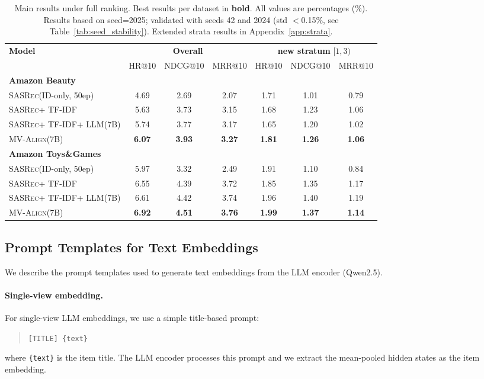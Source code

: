 \documentclass[sigconf,natbib=true]{acmart}
\newcommand{\model}{\textsc{MV-Align}\xspace}
\newcommand{\base}{\textsc{SASRec}\xspace}
\newcommand{\tfidf}{\textsc{TF-IDF}\xspace}
\newcommand{\llm}{\textsc{LLM}\xspace}
\begin{document}
\begin{table}[t]
\caption{Main results under full ranking. Best results per dataset in \textbf{bold}. All values are percentages (\%). Results based on seed=2025; validated with seeds 42 and 2024 (std $<$0.15\%, see Table~\ref{tab:seed_stability}). Extended strata results in Appendix~\ref{app:strata}.}
\label{tab:main}
\centering
\small
\begin{tabular}{lcccccc}
\toprule
\multirow{2}{*}{\textbf{Model}} &
\multicolumn{3}{c}{\textbf{Overall}} &
\multicolumn{3}{c}{\textbf{new stratum} $[1,3)$} \\
\cmidrule(lr){2-4}\cmidrule(lr){5-7}
& HR@10 & NDCG@10 & MRR@10 & HR@10 & NDCG@10 & MRR@10 \\
\midrule
\multicolumn{7}{l}{\textbf{Amazon Beauty}} \\
\base (ID-only, 50ep) & 4.69 & 2.69 & 2.07 & 1.71 & 1.01 & 0.79 \\
\base + \tfidf & 5.63 & 3.73 & 3.15 & 1.68 & 1.23 & 1.06 \\
\base + \tfidf + \llm (7B) & 5.74 & 3.77 & 3.17 & 1.65 & 1.20 & 1.02 \\
\model (7B) & \textbf{6.07} & \textbf{3.93} & \textbf{3.27} & \textbf{1.81} & \textbf{1.26} & \textbf{1.06} \\
\midrule
\multicolumn{7}{l}{\textbf{Amazon Toys\&Games}} \\
\base (ID-only, 50ep) & 5.97 & 3.32 & 2.49 & 1.91 & 1.10 & 0.84 \\
\base + \tfidf & 6.55 & 4.39 & 3.72 & 1.85 & 1.35 & 1.17 \\
\base + \tfidf + \llm (7B) & 6.61 & 4.42 & 3.74 & 1.96 & 1.40 & 1.19 \\
\model (7B) & \textbf{6.92} & \textbf{4.51} & \textbf{3.76} & \textbf{1.99} & \textbf{1.37} & \textbf{1.14} \\
\bottomrule
\end{tabular}
\end{table}

\subsection{Prompt Templates for Text Embeddings}
We describe the prompt templates used to generate text
embeddings from the LLM encoder (Qwen2.5).

\paragraph{Single-view embedding.}
For single-view LLM embeddings, we use a simple title-based
prompt:
\begin{quote}
\texttt{[TITLE] \{text\}}
\end{quote}
where \texttt{\{text\}} is the item title. The LLM encoder
processes this prompt and we extract the mean-pooled hidden
states as the item embedding.
\end{document}
